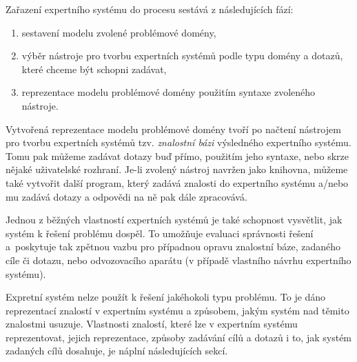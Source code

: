 \clearpage
Zařazení expertního systému do procesu sestává z následujících fází:
\begin{enumerate}
  \item sestavení modelu zvolené problémové domény,
  \item výběr nástroje pro tvorbu expertních systémů podle typu domény a dotazů,
    které chceme být schopni zadávat,
  \item reprezentace modelu problémové domény použitím syntaxe zvoleného
    nástroje.
\end{enumerate}
Vytvořená reprezentace modelu problémové domény tvoří po načtení nástrojem pro
tvorbu expertních systémů tzv. \emph{znalostní bázi} výsledného expertního systému.
Tomu pak můžeme zadávat dotazy buď přímo, použitím jeho syntaxe, nebo skrze
nějaké uživatelské rozhraní. Je-li zvolený nástroj navržen jako knihovna, můžeme
také vytvořit další program, který zadává znalosti do expertního systému a/nebo
mu zadává dotazy a odpovědi na ně pak dále zpracovává.

Jednou z běžných vlastností expertních systémů je také schopnost vysvětlit, jak
systém k řešení problému dospěl. To umožňuje evaluaci správnosti řešení
a~poskytuje tak zpětnou vazbu pro případnou opravu znalostní báze, zadaného cíle
či dotazu, nebo odvozovacího aparátu (v případě vlastního návrhu expertního
systému).

Expretní systém nelze použít k řešení jakéhokoli typu problému. To je dáno
reprezentací znalostí v expertním systému a způsobem, jakým systém nad těmito
znalostmi usuzuje. Vlastnosti znalostí, které lze v expertním systému
reprezentovat, jejich reprezentace, způsoby zadávání cílů a dotazů i to, jak
systém zadaných cílů dosahuje, je náplní následujících sekcí.
